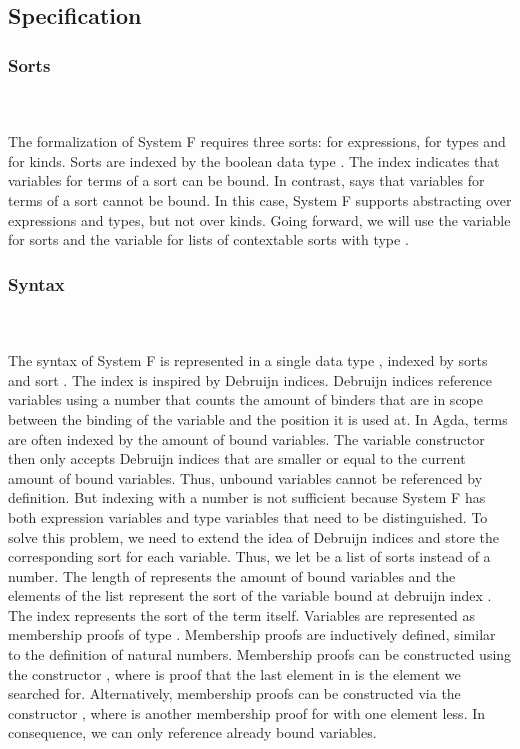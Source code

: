 \subsection{Specification}
\subsubsection{Sorts}\hfill\\\\
The formalization of System F requires three sorts:  for expressions,  for types and  for kinds. 
\FSort
Sorts are indexed by the boolean data type . 
The index  indicates that variables for terms of a sort can be bound. 
In contrast,  says that variables for terms of a sort cannot be bound. 
In this case, System F supports abstracting over expressions and types, but not over kinds. 
Going forward, we will use the variable  for sorts and the variable  for lists of contextable sorts with type \FSorts.

\subsubsection{Syntax}\hfill\\\\
The syntax of System F is represented in a single data type , indexed by sorts  and sort . 
The index  is inspired by Debruijn indices. Debruijn indices reference variables using a number that counts the amount of binders that are in scope between the binding of the variable and the position it is used at.
In Agda, terms are often indexed by the amount of bound variables. The variable constructor then only accepts Debruijn indices that are smaller or equal to the current amount of bound variables. 
Thus, unbound variables cannot be referenced by definition.
But indexing  with a number is not sufficient because System F has both expression variables and type variables that need to be distinguished. 
To solve this problem, we need to extend the idea of Debruijn indices and store the corresponding sort for each variable. Thus, we let  be a list of sorts instead of a number.
The length of  represents the amount of bound variables and the elements  of the list represent the sort of the variable bound at debruijn index . 
The index  represents the sort of the term itself.
\FTerm
Variables   are represented as membership proofs of type   .
Membership proofs are inductively defined, similar to the definition of natural numbers. 
Membership proofs can be constructed using the constructor , where  is proof that the last element in  is the element we searched for. 
Alternatively, membership proofs can be constructed via the constructor  , where  is another membership proof for  with one element less. 
In consequence, we can only reference already bound variables.

